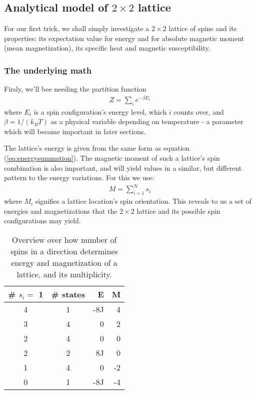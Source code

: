 \documentclass[11pt,a4paper,notitlepage,twocolumn]{article}
\begin{document}
\subsection{Analytical model of $2\times2$ lattice}
For our first trick, we shall simply investigate a $2\times2$ lattice of spins and its properties: its expectation value for energy and for absolute magnetic moment (mean magnetization), its  specific heat and magnetic susceptibility.

\subsubsection{The underlying math}
Firsly, we'll bee needing the partition function
\begin{align}\label{eq:partitionfunc}
Z = \sum_i e^{-\beta E_i}
\end{align}
where $E_i$ is a spin configuration's energy level, which $i$ counts over, and $\beta = 1/(k_B T)$ as a physical variable depending on temperature - a parameter which will become important in later sections.

The lattice's energy is given from the same form as equation (\ref{eq:energysummation}). The magnetic moment of such a lattice's spin combination is also important, and will yield values in a similar, but different pattern to the energy variations. For this we use:
\begin{align}\label{eq:magnetsummation}
M = \sum_{i=1}^N s_i
\end{align}
where $M_i$ signifies a lattice location's spin orientation. This reveals to us a set of energies and magnetizations that the $2\times2$ lattice and its possible spin configurations may yield.
\begin{table}[H]
\center
\begin{tabular}{|c|c|r|r|} \hline

	\# $s_i=$ 1 & \# states & E & M  \\ \hline
	4 & 1 & -8J & 4   \\
	3 & 4 & 0   & 2   \\
	2 & 4 & 0   & 0   \\
	2 & 2 & 8J  & 0   \\
	1 & 4 & 0   & -2  \\
	0 & 1 & -8J & -4  \\ \hline
\end{tabular}
\caption{Overview over how number of spins in a direction determines energy and magnetization of a lattice, and its multiplicity.}\label{table:spincombinations}
\end{table}
\end{document}
